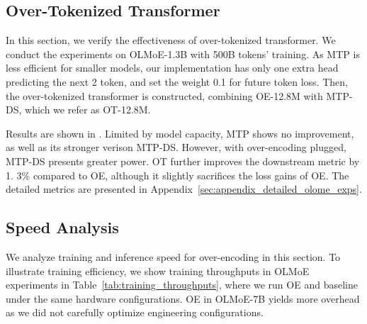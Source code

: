 \subsection{Over-Tokenized Transformer}

In this section, we verify the effectiveness of over-tokenized transformer. We conduct the experiments on OLMoE-1.3B with 500B tokens' training. As MTP is less efficient for smaller models, our implementation has only one extra head predicting the next 2 token, and set the weight 0.1 for future token loss. Then, the over-tokenized transformer is constructed, combining OE-12.8M with MTP-DS, which we refer as OT-12.8M.

Results are shown in . 
Limited by model capacity, MTP shows no improvement, as well as its stronger verison MTP-DS. However, with over-encoding plugged, MTP-DS presents greater power. OT further improves the downstream metric by 1. 3\% compared to OE, although it slightly sacrifices the loss gains of OE. The detailed metrics are presented in Appendix~\ref{sec:appendix_detailed_olome_exps}.

\begin{table}
\centering
\caption{MTP Experiments on OLMoE-1.3B. The loss refers to the next one token prediction loss for MTP methods. Metric difference that improves baseline are marked blue while degrations are marked red.}
\label{tab:olmoe_mtp_oe}
\end{table}

\subsection{Speed Analysis}
We analyze training and inference speed for over-encoding in this section. To illustrate training efficiency, we show training throughputs in OLMoE experiments in Table~\ref{tab:training_throughputs}, where we run OE and baseline under the same hardware configurations. OE in OLMoE-7B yields more overhead as we did not carefully optimize engineering configurations. 

